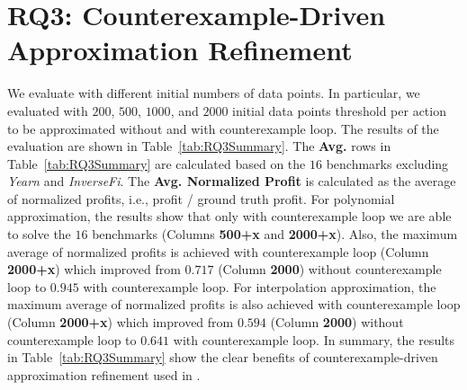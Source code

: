 \section{RQ3: Counterexample-Driven Approximation Refinement}

We evaluate {\name} with different initial numbers of data points. In
particular, we evaluated {\name} with $200$, $500$, $1000$, and $2000$ initial
data points threshold per action to be approximated without and with
counterexample loop. The results
of the evaluation are shown in Table~\ref{tab:RQ3Summary}. The \textbf{Avg.}
rows in Table~\ref{tab:RQ3Summary} are calculated based on the $16$ benchmarks
excluding \emph{Yearn} and \emph{InverseFi}. The \textbf{Avg. Normalized
Profit} is calculated as the average of normalized profits, i.e., profit /
ground truth profit. For polynomial approximation, the results show that only
with counterexample loop we are able to solve the $16$ benchmarks (Columns
\textbf{500+x} and \textbf{2000+x}). Also, the maximum average of normalized
profits is achieved with counterexample loop (Column \textbf{2000+x}) which
improved from $0.717$ (Column \textbf{2000}) without counterexample loop to
$0.945$ with counterexample loop. For interpolation approximation, the maximum
average of normalized profits is also achieved with counterexample loop (Column
\textbf{2000+x}) which improved from $0.594$ (Column \textbf{2000}) without
counterexample loop to $0.641$ with counterexample loop. In summary, the
results in Table~\ref{tab:RQ3Summary} show the clear benefits of
counterexample-driven approximation refinement used in {\name}. 





%

